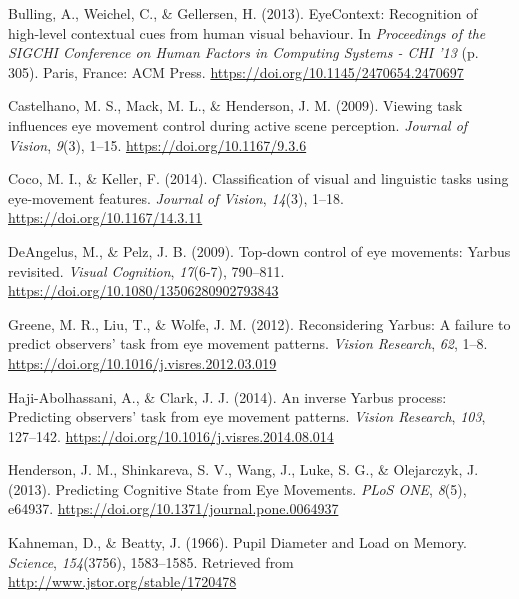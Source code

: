 \documentclass[
  english,
  man, donotrepeattitle,floatsintext]{apa6}
\begin{document}
\leavevmode\hypertarget{ref-bullingEyeContextRecognitionHighlevel2013a}{}%
Bulling, A., Weichel, C., \& Gellersen, H. (2013). EyeContext: Recognition of high-level contextual cues from human visual behaviour. In \emph{Proceedings of the SIGCHI Conference on Human Factors in Computing Systems - CHI '13} (p. 305). Paris, France: ACM Press. \url{https://doi.org/10.1145/2470654.2470697}

\leavevmode\hypertarget{ref-castelhanoViewingTaskInfluences2009a}{}%
Castelhano, M. S., Mack, M. L., \& Henderson, J. M. (2009). Viewing task influences eye movement control during active scene perception. \emph{Journal of Vision}, \emph{9}(3), 1--15. \url{https://doi.org/10.1167/9.3.6}

\leavevmode\hypertarget{ref-cocoClassificationVisualLinguistic2014a}{}%
Coco, M. I., \& Keller, F. (2014). Classification of visual and linguistic tasks using eye-movement features. \emph{Journal of Vision}, \emph{14}(3), 1--18. \url{https://doi.org/10.1167/14.3.11}

\leavevmode\hypertarget{ref-deangelusTopdownControlEye2009a}{}%
DeAngelus, M., \& Pelz, J. B. (2009). Top-down control of eye movements: Yarbus revisited. \emph{Visual Cognition}, \emph{17}(6-7), 790--811. \url{https://doi.org/10.1080/13506280902793843}

\leavevmode\hypertarget{ref-greeneReconsideringYarbusFailure2012c}{}%
Greene, M. R., Liu, T., \& Wolfe, J. M. (2012). Reconsidering Yarbus: A failure to predict observers' task from eye movement patterns. \emph{Vision Research}, \emph{62}, 1--8. \url{https://doi.org/10.1016/j.visres.2012.03.019}

\leavevmode\hypertarget{ref-haji-abolhassaniInverseYarbusProcess2014c}{}%
Haji-Abolhassani, A., \& Clark, J. J. (2014). An inverse Yarbus process: Predicting observers' task from eye movement patterns. \emph{Vision Research}, \emph{103}, 127--142. \url{https://doi.org/10.1016/j.visres.2014.08.014}

\leavevmode\hypertarget{ref-hendersonPredictingCognitiveState2013c}{}%
Henderson, J. M., Shinkareva, S. V., Wang, J., Luke, S. G., \& Olejarczyk, J. (2013). Predicting Cognitive State from Eye Movements. \emph{PLoS ONE}, \emph{8}(5), e64937. \url{https://doi.org/10.1371/journal.pone.0064937}

\leavevmode\hypertarget{ref-kahnemanPupilDiameterLoad1966}{}%
Kahneman, D., \& Beatty, J. (1966). Pupil Diameter and Load on Memory. \emph{Science}, \emph{154}(3756), 1583--1585. Retrieved from \url{http://www.jstor.org/stable/1720478}
\end{document}
